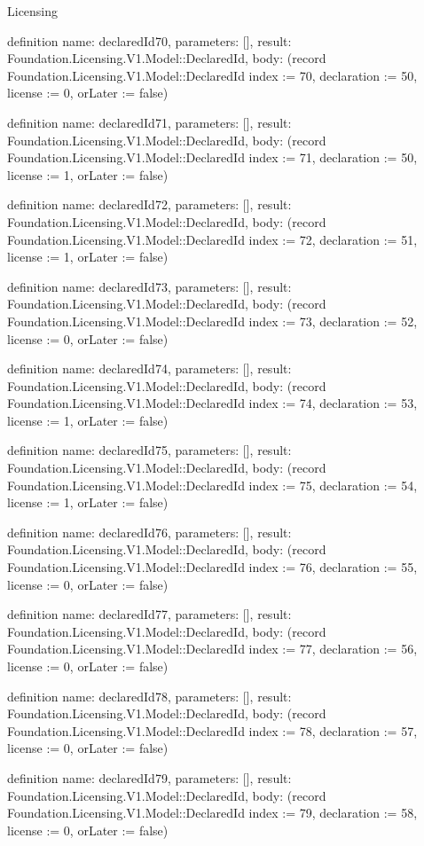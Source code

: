 \begin{lexlean}{Licensing}
\begin{semanticmodule}
definition{
  name: declaredId70,
  parameters: [],
  result: Foundation.Licensing.V1.Model::DeclaredId,
  body: (record Foundation.Licensing.V1.Model::DeclaredId {index := 70, declaration := 50, license := 0, orLater := false})
}

definition{
  name: declaredId71,
  parameters: [],
  result: Foundation.Licensing.V1.Model::DeclaredId,
  body: (record Foundation.Licensing.V1.Model::DeclaredId {index := 71, declaration := 50, license := 1, orLater := false})
}

definition{
  name: declaredId72,
  parameters: [],
  result: Foundation.Licensing.V1.Model::DeclaredId,
  body: (record Foundation.Licensing.V1.Model::DeclaredId {index := 72, declaration := 51, license := 1, orLater := false})
}

definition{
  name: declaredId73,
  parameters: [],
  result: Foundation.Licensing.V1.Model::DeclaredId,
  body: (record Foundation.Licensing.V1.Model::DeclaredId {index := 73, declaration := 52, license := 0, orLater := false})
}

definition{
  name: declaredId74,
  parameters: [],
  result: Foundation.Licensing.V1.Model::DeclaredId,
  body: (record Foundation.Licensing.V1.Model::DeclaredId {index := 74, declaration := 53, license := 1, orLater := false})
}

definition{
  name: declaredId75,
  parameters: [],
  result: Foundation.Licensing.V1.Model::DeclaredId,
  body: (record Foundation.Licensing.V1.Model::DeclaredId {index := 75, declaration := 54, license := 1, orLater := false})
}

definition{
  name: declaredId76,
  parameters: [],
  result: Foundation.Licensing.V1.Model::DeclaredId,
  body: (record Foundation.Licensing.V1.Model::DeclaredId {index := 76, declaration := 55, license := 0, orLater := false})
}

definition{
  name: declaredId77,
  parameters: [],
  result: Foundation.Licensing.V1.Model::DeclaredId,
  body: (record Foundation.Licensing.V1.Model::DeclaredId {index := 77, declaration := 56, license := 0, orLater := false})
}

definition{
  name: declaredId78,
  parameters: [],
  result: Foundation.Licensing.V1.Model::DeclaredId,
  body: (record Foundation.Licensing.V1.Model::DeclaredId {index := 78, declaration := 57, license := 0, orLater := false})
}

definition{
  name: declaredId79,
  parameters: [],
  result: Foundation.Licensing.V1.Model::DeclaredId,
  body: (record Foundation.Licensing.V1.Model::DeclaredId {index := 79, declaration := 58, license := 0, orLater := false})
}


\end{semanticmodule}
\end{lexlean}
